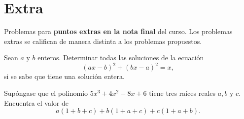 \section{Extra}

Problemas para \textbf{puntos extras en la nota final} del curso.
Los problemas extras se califican de manera distinta a los problemas propuestos.

\begin{problem}
    Sean $a$ y $b$ enteros.
    Determinar todas las soluciones de la ecuación
    \[(ax - b)^2 + (bx - a)^2 =  x,\] si se sabe que tiene una solución entera.
\end{problem}

\begin{problem}
    Supóngase que el polinomio $5x^3 + 4x^2 - 8x + 6$ tiene tres raíces reales $a, b \mbox{ y } c$.
    Encuentra el valor de
    \[a(1 + b + c) + b(1 + a + c) + c(1 + a + b).\]
\end{problem}